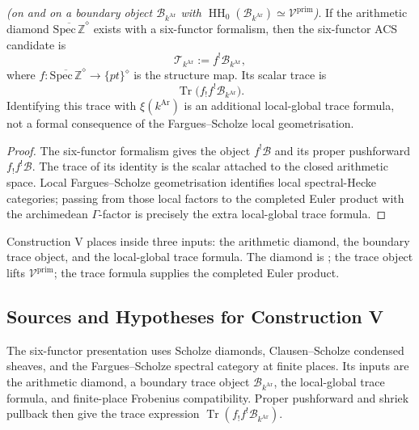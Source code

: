 \begin{proposition}
\label{v4-arith:w10-a:prop:six-fun-ACS}
\ClaimStatusConditional \emph{(on
 and on a boundary object
\(\mathscr B_{k^{\mathrm{Ar}}}\) with
\(\operatorname{HH}_{0}(\mathscr B_{k^{\mathrm{Ar}}})
\simeq\mathcal V^{\mathrm{prim}}\))}. If the arithmetic diamond
\(\overline{\mathrm{Spec}\,\mathbb Z}^{\diamond}\) exists with a
six-functor formalism, then the six-functor ACS candidate is
\[
        \mathcal T_{k^{\mathrm{Ar}}}:=
        f^{!}\mathscr B_{k^{\mathrm{Ar}}},
\]
where
\(f:\overline{\mathrm{Spec}\,\mathbb Z}^{\diamond}\to\{pt\}^{\diamond}\)
is the structure map. Its scalar trace is
\[
        \operatorname{Tr}\bigl(f_{!}f^{!}\mathscr B_{k^{\mathrm{Ar}}}\bigr).
\]
Identifying this trace with \(\xi(k^{\mathrm{Ar}})\) is an additional
local-global trace formula, not a formal consequence of the
Fargues--Scholze local geometrisation.
\end{proposition}

\begin{proof}
The six-functor formalism gives the object \(f^{!}\mathscr B\) and its
proper pushforward \(f_{!}f^{!}\mathscr B\). The trace of its identity
is the scalar attached to the closed arithmetic space. Local
Fargues--Scholze geometrisation identifies local spectral-Hecke
categories; passing from those local factors to the completed
Euler product with the archimedean \(\Gamma\)-factor is precisely the
extra local-global trace formula.
\end{proof}

\begin{remark}
\label{v4-arith:w10-a:rem:construction-V-form}
Construction V places  inside
three inputs: the arithmetic diamond, the boundary trace object, and
the local-global trace formula. The diamond is
; the trace object lifts
\(\mathcal V^{\mathrm{prim}}\); the trace formula supplies the completed
Euler product.
\end{remark}

\subsection{Sources and Hypotheses for Construction V}
\label{v4-arith:w10-a:ah:construction-V}

The six-functor presentation uses Scholze diamonds, Clausen--Scholze
condensed sheaves, and the Fargues--Scholze spectral category at finite
places. Its inputs are the arithmetic diamond, a boundary trace object
\(\mathscr B_{k^{\mathrm{Ar}}}\), the local-global trace formula, and
finite-place Frobenius compatibility. Proper pushforward and shriek
pullback then give the trace expression
\(\operatorname{Tr}(f_!f^!\mathscr B_{k^{\mathrm{Ar}}})\).

